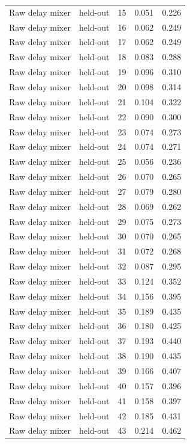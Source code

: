 \begin{tabular}{llrrr}
Raw delay mixer & held-out & 15 & 0.051 & 0.226 \\
Raw delay mixer & held-out & 16 & 0.062 & 0.249 \\
Raw delay mixer & held-out & 17 & 0.062 & 0.249 \\
Raw delay mixer & held-out & 18 & 0.083 & 0.288 \\
Raw delay mixer & held-out & 19 & 0.096 & 0.310 \\
Raw delay mixer & held-out & 20 & 0.098 & 0.314 \\
Raw delay mixer & held-out & 21 & 0.104 & 0.322 \\
Raw delay mixer & held-out & 22 & 0.090 & 0.300 \\
Raw delay mixer & held-out & 23 & 0.074 & 0.273 \\
Raw delay mixer & held-out & 24 & 0.074 & 0.271 \\
Raw delay mixer & held-out & 25 & 0.056 & 0.236 \\
Raw delay mixer & held-out & 26 & 0.070 & 0.265 \\
Raw delay mixer & held-out & 27 & 0.079 & 0.280 \\
Raw delay mixer & held-out & 28 & 0.069 & 0.262 \\
Raw delay mixer & held-out & 29 & 0.075 & 0.273 \\
Raw delay mixer & held-out & 30 & 0.070 & 0.265 \\
Raw delay mixer & held-out & 31 & 0.072 & 0.268 \\
Raw delay mixer & held-out & 32 & 0.087 & 0.295 \\
Raw delay mixer & held-out & 33 & 0.124 & 0.352 \\
Raw delay mixer & held-out & 34 & 0.156 & 0.395 \\
Raw delay mixer & held-out & 35 & 0.189 & 0.435 \\
Raw delay mixer & held-out & 36 & 0.180 & 0.425 \\
Raw delay mixer & held-out & 37 & 0.193 & 0.440 \\
Raw delay mixer & held-out & 38 & 0.190 & 0.435 \\
Raw delay mixer & held-out & 39 & 0.166 & 0.407 \\
Raw delay mixer & held-out & 40 & 0.157 & 0.396 \\
Raw delay mixer & held-out & 41 & 0.158 & 0.397 \\
Raw delay mixer & held-out & 42 & 0.185 & 0.431 \\
Raw delay mixer & held-out & 43 & 0.214 & 0.462 \\

\end{tabular}
